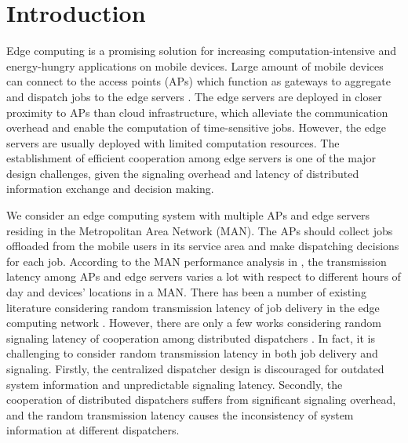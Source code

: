 \section{Introduction}
\label{sec:introduction}
Edge computing is a promising solution for increasing computation-intensive and energy-hungry applications on mobile devices.
Large amount of mobile devices can connect to the access points (APs) which function as gateways to aggregate and dispatch jobs to the edge servers \cite{MEC-SURVEY}.
The edge servers are deployed {in closer proximity} to APs than cloud infrastructure, which alleviate the communication overhead and enable the computation of time-sensitive jobs.
However, the edge servers are usually deployed with limited computation resources.
The establishment of efficient cooperation among edge servers is one of the major design challenges, {given the signaling overhead and latency of distributed information exchange and decision making.}

We consider an edge computing system with multiple APs and edge servers residing in the Metropolitan Area Network (MAN).
The APs should collect jobs offloaded from the mobile users in its service area and make dispatching decisions for each job.
According to the MAN performance analysis in \cite{MAN-LATENCY}, the transmission latency {among APs and edge servers} varies a lot with respect to different hours of day and devices' locations in a MAN.
There has been a number of existing literature considering random transmission latency of job delivery in the edge computing network \cite{latency-EDGE19,MOBIHOC19-ZhouZ,IOTJ18-FanQ,TOC19-LiuC,JSAC19-AlameddineHA}.
However, there are only a few works considering random signaling latency of cooperation among distributed dispatchers \cite{tan-online,TWC18-LyuX}.
In fact, it is challenging to consider random transmission latency in both job delivery and signaling.
Firstly, the centralized dispatcher design is discouraged for outdated system information and unpredictable signaling latency.
Secondly, the cooperation of distributed dispatchers suffers from significant signaling overhead, and the random transmission latency causes the inconsistency of system information at different dispatchers.

